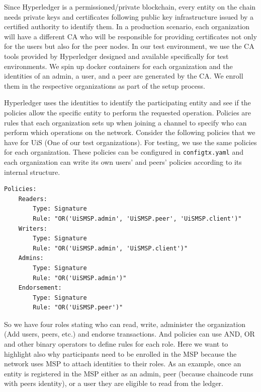 \bigskip
Since Hyperledger is a permissioned/private blockchain, every entity on the chain needs private keys and certificates following public key infrastructure issued by a certified authority to identify them. In a production scenario, each organization will have a different CA who will be responsible for providing certificates not only for the users but also for the peer nodes. In our test environment, we use the CA tools provided by Hyperledger designed and available specifically for test environments. We spin up docker containers for each organization and the identities of an admin, a user, and a peer are generated by the CA. We enroll them in the respective organizations as part of the setup process.

\bigskip
Hyperledger uses the identities to identify the participating entity and see if the policies allow the specific entity to perform the requested operation. Policies are rules that each organization sets up when joining a channel to specify who can perform which operations on the network. Consider the following policies that we have for UiS (One of our test organizations). For testing, we use the same policies for each organization. These policies can be configured in \lstinline{configtx.yaml} and each organization can write its own users' and peers' policies according to its internal structure.

\begin{lstlisting}[caption={Policies for UiS (one of our test organization). We use the same policies for other organizations as well.}]
Policies:
    Readers:
        Type: Signature
        Rule: "OR('UiSMSP.admin', 'UiSMSP.peer', 'UiSMSP.client')"
    Writers:
        Type: Signature
        Rule: "OR('UiSMSP.admin', 'UiSMSP.client')"
    Admins:
        Type: Signature
        Rule: "OR('UiSMSP.admin')"
    Endorsement:
        Type: Signature
        Rule: "OR('UiSMSP.peer')"
\end{lstlisting}

\bigskip
So we have four roles stating who can read, write, administer the organization (Add users, peers, etc.) and endorse transactions. And policies can use AND, OR and other binary operators to define rules for each role. Here we want to highlight also why participants need to be enrolled in the MSP because the network uses MSP to attach identities to their roles. As an example, once an entity is registered in the MSP either as an admin, peer (because chaincode runs with peers identity), or a user they are eligible to read from the ledger.

